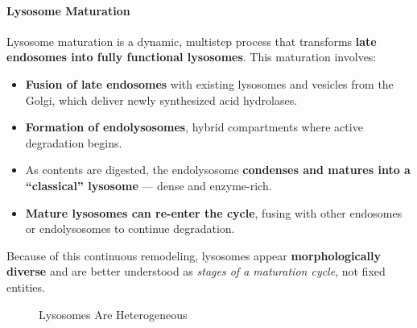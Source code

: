 \documentclass[../main.tex]{subfiles}
\begin{document}
\paragraph{Lysosome Maturation}
Lysosome maturation is a dynamic, multistep process that transforms \textbf{late endosomes into fully functional lysosomes}. This maturation involves:
\begin{itemize}
	\item \textbf{Fusion of late endosomes} with existing lysosomes and vesicles from the Golgi, which deliver newly synthesized acid hydrolases.
	\item \textbf{Formation of endolysosomes}, hybrid compartments where active degradation begins.
	\item As contents are digested, the endolysosome \textbf{condenses and matures into a “classical” lysosome} — dense and enzyme-rich.
	\item \textbf{Mature lysosomes can re-enter the cycle}, fusing with other endosomes or endolysosomes to continue degradation.
\end{itemize}
Because of this continuous remodeling, lysosomes appear \textbf{morphologically diverse} and are better understood as \textit{stages of a maturation cycle}, not fixed entities.

\begin{figure}[H]
	\centering
	\caption{Lysosomes Are Heterogeneous}
\end{figure}
\end{document}
